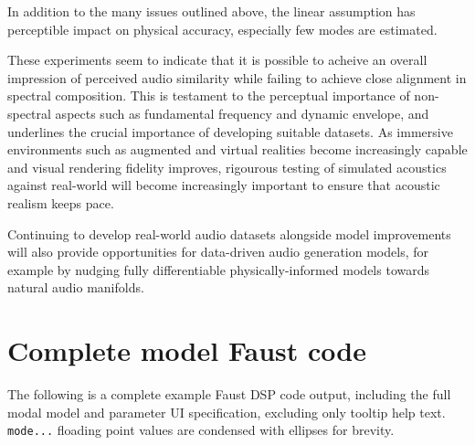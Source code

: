 \documentclass[12pt]{article}
\begin{document}
In addition to the many issues outlined above, the linear assumption has perceptible impact on physical accuracy, especially few modes are estimated.

These experiments seem to indicate that it is possible to acheive an overall impression of perceived audio similarity while failing to achieve close alignment in spectral composition.
This is testament to the perceptual importance of non-spectral aspects such as fundamental frequency and dynamic envelope, and underlines the crucial importance of developing suitable datasets.
As immersive environments such as augmented and virtual realities become increasingly capable and visual rendering fidelity improves, rigourous testing of simulated acoustics against real-world will become increasingly important to ensure that acoustic realism keeps pace.

Continuing to develop real-world audio datasets alongside model improvements will also provide opportunities for data-driven audio generation models, for example by nudging fully differentiable physically-informed models \cite{engel_ddsp_2019} \cite{wang_neural_2019} towards natural audio manifolds.




\newpage

\appendix

\section{Complete model Faust code}
\label{sec:FaustCode}
The following is a complete example Faust DSP code output, including the full modal model and parameter UI specification, excluding only tooltip help text.
\verb|mode...| floading point values are condensed with ellipses for brevity.
\end{document}
